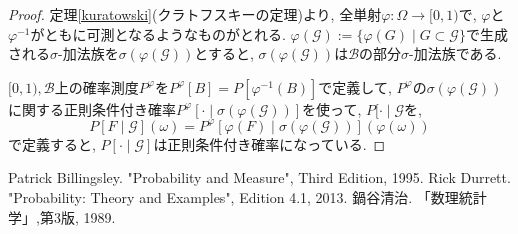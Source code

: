 \documentclass[a4paper,12pt]{jsarticle}
\theoremstyle{break}
\begin{document}
\begin{proof}
定理\ref{kuratowski}(クラトフスキーの定理)より, 全単射$\varphi:\Omega\to[0,1)$で, $\varphi$と$\varphi^{-1}$がともに可測となるようなものがとれる. 
$\varphi(\mathcal{G}):=\{\varphi(G) \mid G\subset\mathcal{G}\}$で生成される$\sigma$-加法族を$\sigma(\varphi(\mathcal{G}))$とすると,
$\sigma(\varphi(\mathcal{G}))$は$\mathcal{B}$の部分$\sigma$-加法族である.
\par $[0,1),\mathcal{B}$上の確率測度$P^\varphi$を$P^\varphi [B]=P[\varphi^{-1}(B)]$で定義して, 
$P^\varphi$の$\sigma(\varphi(\mathcal{G}))$に関する正則条件付き確率$P^\varphi[\cdot\mid\sigma(\varphi(\mathcal{G}))]$を使って, 
$P[\cdot\mid\mathcal{G}$を, 
\begin{equation*}
P[F\mid\mathcal{G}](\omega)=P^\varphi[\varphi(F)\mid\sigma(\varphi(\mathcal{G}))](\varphi(\omega))
\end{equation*}
で定義すると, $P[\cdot\mid\mathcal{G}]$は正則条件付き確率になっている.
\end{proof}


\begin{thebibliography}{9}
Patrick Billingsley. "Probability and Measure", Third Edition, 1995.
Rick Durrett. "Probability: Theory and Examples", Edition 4.1, 2013.
鍋谷清治. 「数理統計学」,第3版, 1989.
\end{thebibliography}
\end{document}
